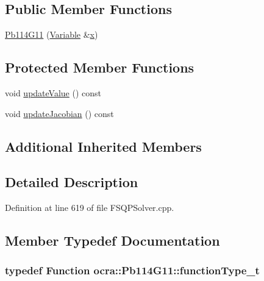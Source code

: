 \subsection*{Public Member Functions}
\begin{DoxyCompactItemize}
\item 
\hyperlink{classocra_1_1Pb114G11_a530be5f34e9ae31c8db6b1a62658dbe6}{Pb114\+G11} (\hyperlink{classocra_1_1Variable}{Variable} \&\hyperlink{classocra_1_1Function_a28825886d1f149c87b112ec2ec1dd486}{x})
\end{DoxyCompactItemize}
\subsection*{Protected Member Functions}
\begin{DoxyCompactItemize}
\item 
void \hyperlink{classocra_1_1Pb114G11_a8b0fef2742cf383741e9b49526b24ffc}{update\+Value} () const 
\item 
void \hyperlink{classocra_1_1Pb114G11_a019c99df2b49411274c94cd6eb0e8450}{update\+Jacobian} () const 
\end{DoxyCompactItemize}
\subsection*{Additional Inherited Members}


\subsection{Detailed Description}


Definition at line 619 of file F\+S\+Q\+P\+Solver.\+cpp.



\subsection{Member Typedef Documentation}
\subsubsection[{\texorpdfstring{function\+Type\+\_\+t}{functionType_t}}]{\setlength{\rightskip}{0pt plus 5cm}typedef {\bf Function} {\bf ocra\+::\+Pb114\+G11\+::function\+Type\+\_\+t}}\hypertarget{classocra_1_1Pb114G11_a6a78a86715026be7613e399955407e93}{}\label{classocra_1_1Pb114G11_a6a78a86715026be7613e399955407e93}


